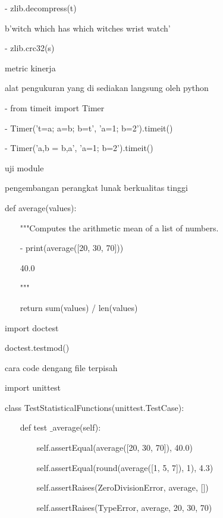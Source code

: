 - zlib.decompress(t) \par
\noindent 
b'witch which has which witches wrist watch' \par
\noindent 
- zlib.crc32(s) \par
{} \par
\noindent 
metric kinerja \par
\noindent 
alat pengukuran yang di sediakan langsung oleh python \par
\noindent 
- from timeit import Timer \par
\noindent 
- Timer('t=a; a=b; b=t', 'a=1; b=2').timeit() \par
{} \par
\noindent 
- Timer('a,b = b,a', 'a=1; b=2').timeit() \par
{} \par
\noindent 
uji module  \par
\noindent 
pengembangan perangkat lunak berkualitas tinggi \par
\noindent 
def average(values): \par
\noindent 
~~~ """Computes the arithmetic mean of a list of numbers. \par
\vspace{12pt}
\noindent 
~~~ - print(average([20, 30, 70])) \par
\noindent 
~~~ 40.0 \par
\noindent 
~~~ """ \par
\noindent 
~~~ return sum(values) / len(values) \par
\noindent 
import doctest \par
\noindent 
doctest.testmod()~~  \par
\noindent 
cara code dengang file terpisah \par
\noindent 
import unittest \par
\noindent 
class TestStatisticalFunctions(unittest.TestCase): \par
\noindent 
~~~ def test $  \_  $average(self): \par
\noindent 
~~~~~~~ self.assertEqual(average([20, 30, 70]), 40.0) \par
\noindent 
~~~~~~~ self.assertEqual(round(average([1, 5, 7]), 1), 4.3) \par
\noindent 
~~~~~~~ self.assertRaises(ZeroDivisionError, average, []) \par
\noindent 
~~~~~~~ self.assertRaises(TypeError, average, 20, 30, 70) \par
